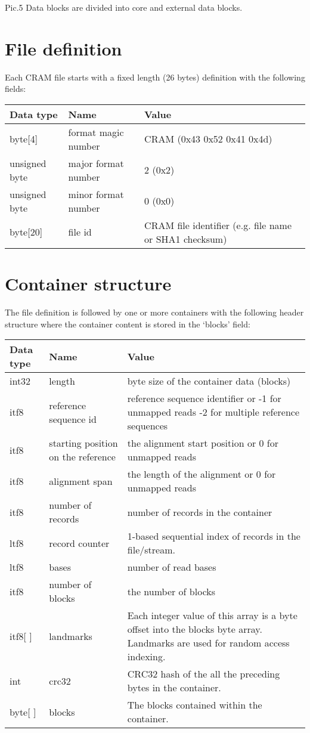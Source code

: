 \documentclass[a4paper]{article}
\begin{document}
Pic.5 Data blocks are divided into core and external data blocks. 

\section{\textbf{File definition}}

Each CRAM file starts with a fixed length (26 bytes) definition with the following 
fields:

\begin{tabular}{|l|l|l|}
\hline
\textbf{Data type} & \textbf{Name} & \textbf{Value}\tabularnewline
\hline
byte[4] & format magic number & CRAM (0x43 0x52 0x41 0x4d)\tabularnewline
\hline
unsigned byte & major format number & 2 (0x2)\tabularnewline
\hline
unsigned byte & minor format number & 0 (0x0)\tabularnewline
\hline
byte[20] & file id & CRAM file identifier (e.g. file name or SHA1 checksum)\tabularnewline
\hline
\end{tabular}

\section{\textbf{Container structure}}

The file definition is followed by one or more containers with the following header 
structure where the container content is stored in the `blocks' field:

\begin{tabular}{|l|>{\raggedright}p{120pt}|>{\raggedright}p{260pt}|}
\hline
\textbf{Data type} & \textbf{Name} & \textbf{Value}
\tabularnewline
\hline
int32 & length & byte size of the container data (blocks)\tabularnewline
\hline
itf8 & reference sequence id & reference sequence identifier  or\linebreak{}
-1 for unmapped reads\linebreak{}
-2 for multiple reference sequences\tabularnewline
\hline
itf8 & starting position on the reference & the alignment start position or\linebreak{}
0 for unmapped reads\tabularnewline
\hline
itf8 & alignment span & the length of the alignment or\linebreak{}
0 for unmapped reads\tabularnewline
\hline
itf8 & number of records & number of records in the container\tabularnewline
\hline
ltf8 & record counter & 1-based sequential index of records in the file/stream.\tabularnewline
\hline
ltf8 & bases & number of read bases\tabularnewline
\hline
itf8 & number of blocks & the number of blocks\tabularnewline
\hline
itf8[ ] & landmarks & Each integer value of this array is a byte offset into the 
blocks byte array. Landmarks are used for random access indexing.\tabularnewline
\hline
int & crc32 & CRC32 hash of the all the preceding bytes in the container.\tabularnewline
\hline
byte[ ] & blocks & The blocks contained within the container.\tabularnewline
\hline
\end{tabular}
\end{document}
